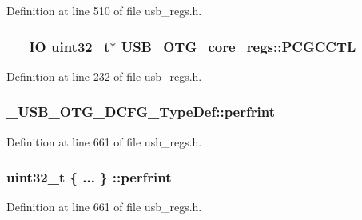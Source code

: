 Definition at line 510 of file usb\-\_\-regs.\-h.

\hypertarget{group___u_s_b___o_t_g___d_r_i_v_e_r_gae5fe2df4421b19989a06769f2fa772e0}{
\subsubsection[{P\-C\-G\-C\-C\-T\-L}]{\setlength{\rightskip}{0pt plus 5cm}\-\_\-\-\_\-\-I\-O {\bf uint32\-\_\-t}$\ast$ U\-S\-B\-\_\-\-O\-T\-G\-\_\-core\-\_\-regs\-::\-P\-C\-G\-C\-C\-T\-L}}\label{group___u_s_b___o_t_g___d_r_i_v_e_r_gae5fe2df4421b19989a06769f2fa772e0}


Definition at line 232 of file usb\-\_\-regs.\-h.

\hypertarget{group___u_s_b___o_t_g___d_r_i_v_e_r_ga9457374dd209907da9cd87735a0db113}{
\subsubsection[{perfrint}]{ \-\_\-\-U\-S\-B\-\_\-\-O\-T\-G\-\_\-\-D\-C\-F\-G\-\_\-\-Type\-Def\-::perfrint}}\label{group___u_s_b___o_t_g___d_r_i_v_e_r_ga9457374dd209907da9cd87735a0db113}


Definition at line 661 of file usb\-\_\-regs.\-h.

\hypertarget{group___u_s_b___o_t_g___d_r_i_v_e_r_gad1855809f9d22db24f71a021bce3e570}{
\subsubsection[{perfrint}]{\setlength{\rightskip}{0pt plus 5cm}uint32\-\_\-t \{ ... \} \-::perfrint}}\label{group___u_s_b___o_t_g___d_r_i_v_e_r_gad1855809f9d22db24f71a021bce3e570}


Definition at line 661 of file usb\-\_\-regs.\-h.

